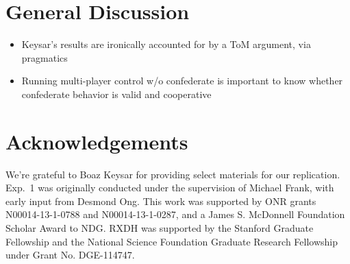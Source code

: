 \documentclass[10pt,letterpaper]{article}
\begin{document}
\section{General Discussion}

\begin{itemize}
\item Keysar's results are ironically accounted for by a ToM argument, via pragmatics
\item Running multi-player control w/o confederate is important to know whether confederate behavior is valid and cooperative
\end{itemize}

\section{Acknowledgements}

\small We're grateful to Boaz Keysar for providing select materials for our replication. Exp.~1 was originally conducted under the supervision of Michael Frank, with early input from Desmond Ong. This work was supported by ONR grants N00014-13-1-0788 and N00014-13-1-0287,  and a James S. McDonnell Foundation Scholar Award to NDG. RXDH was supported by the Stanford Graduate Fellowship and the National Science Foundation Graduate Research Fellowship under Grant No. DGE-114747. 



\setlength{\bibleftmargin}{.125in}
\setlength{\bibindent}{-\bibleftmargin}


\end{document}
